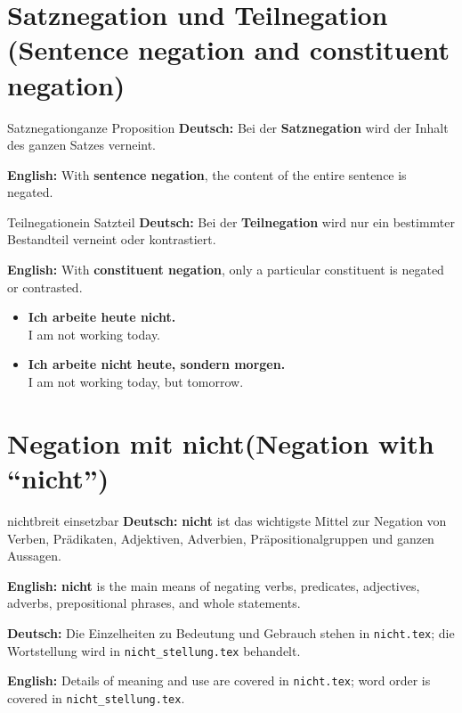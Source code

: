 \documentclass[a4paper,11pt]{article}
\newcommand{\GermanText}[1]{\textbf{Deutsch: }#1\par}
\newcommand{\EnglishText}[1]{{\small\color{SoftGray}\textbf{English: }#1\par}}
\newcommand{\ExampleItem}[2]{\item \textbf{#1}\\{\small\color{SoftGray}#2}}
\begin{document}
\section{Satznegation und Teilnegation \textnormal{(Sentence negation and constituent negation)}}
\begin{grammarentry}{Satznegation}{ganze Proposition}
\GermanText{Bei der \textbf{Satznegation} wird der Inhalt des ganzen Satzes verneint.}
\EnglishText{With \textbf{sentence negation}, the content of the entire sentence is negated.}
\end{grammarentry}
\begin{grammarentry}{Teilnegation}{ein Satzteil}
\GermanText{Bei der \textbf{Teilnegation} wird nur ein bestimmter Bestandteil verneint oder kontrastiert.}
\EnglishText{With \textbf{constituent negation}, only a particular constituent is negated or contrasted.}
\end{grammarentry}
\begin{exbox}\begin{itemize}
\ExampleItem{Ich arbeite heute nicht.}{I am not working today.}
\ExampleItem{Ich arbeite nicht heute, sondern morgen.}{I am not working today, but tomorrow.}
\end{itemize}\end{exbox}

\section{Negation mit \glqq nicht\grqq \textnormal{(Negation with ``nicht'')}}
\begin{grammarentry}{nicht}{breit einsetzbar}
\GermanText{\textbf{nicht} ist das wichtigste Mittel zur Negation von Verben, Prädikaten, Adjektiven, Adverbien, Präpositionalgruppen und ganzen Aussagen.}
\EnglishText{\textbf{nicht} is the main means of negating verbs, predicates, adjectives, adverbs, prepositional phrases, and whole statements.}
\GermanText{Die Einzelheiten zu Bedeutung und Gebrauch stehen in \texttt{nicht.tex}; die Wortstellung wird in \texttt{nicht\_stellung.tex} behandelt.}
\EnglishText{Details of meaning and use are covered in \texttt{nicht.tex}; word order is covered in \texttt{nicht\_stellung.tex}.}
\end{grammarentry}
\end{document}
